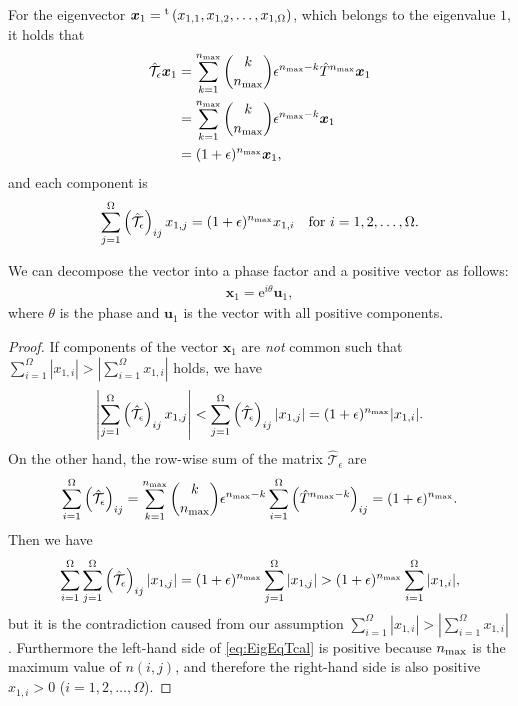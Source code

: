 For the eigenvector $\bm{x}_{1}={}^{\rm t}\left(x_{1,1},x_{1,2},\dots,x_{1,\Omega}\right)$, which belongs to the eigenvalue $1$, it holds that
\begin{align}
\hat{\mathcal{T}}_{\epsilon}\bm{x}_{1} &= \sum_{k=1}^{n_{\rm max}}\binom{k}{n_{\rm max}}\epsilon^{n_{\rm max}-k}\hat{T}^{n_{\rm max}}\bm{x}_{1}\\
&= \sum_{k=1}^{n_{\rm max}}\binom{k}{n_{\rm max}}\epsilon^{n_{\rm max}-k}\bm{x}_{1}\\
&= (1+\epsilon)^{n_{\rm max}}\bm{x}_{1},
\end{align}
and each component is
\begin{align}
\sum_{j=1}^{\Omega}\left(\hat{\mathcal{T}}_{\epsilon}\right)_{ij}x_{1,j} = (1+\epsilon)^{n_{\rm max}}x_{1,i}\quad\text{for $i=1,2,\dots,\Omega$}\label{eq:EigEqTcal}.
\end{align}

\begin{lemma}
	We can decompose the vector into a phase factor and a positive vector as follows:
	\begin{align}
	\bm{x}_{1} = \mathrm{e}^{i\theta}\bm{u}_{1},
	\end{align}
	where $\theta$ is the phase and $\bm{u}_{1}$ is the vector with all positive components.
\end{lemma}

\begin{proof}
	If components of the vector $\bm{x}_{1}$ are \textit{not} common such that $\sum_{i=1}^{\Omega}|x_{1,i}|>|\sum_{i=1}^{\Omega}x_{1,i}|$ holds, we have
	\begin{align}
	\left|\sum_{j=1}^{\Omega}\left(\hat{\mathcal{T}}_{\epsilon}\right)_{ij}x_{1,j}\right| < \sum_{j=1}^{\Omega}\left(\hat{\mathcal{T}}_{\epsilon}\right)_{ij}|x_{1,j}| = (1+\epsilon)^{n_{\rm max}}|x_{1,i}|.
	\end{align}
	On the other hand, the row-wise sum of the matrix $\hat{\mathcal{T}}_{\epsilon}$ are
	\begin{align}
	\sum_{i=1}^{\Omega}\left(\hat{\mathcal{T}}_{\epsilon}\right)_{ij} = \sum_{k=1}^{n_{\rm max}}\binom{k}{n_{\rm max}}\epsilon^{n_{\rm max}-k}\sum_{i=1}^{\Omega}\left(\hat{T}^{n_{\rm max}-k}\right)_{ij} = (1+\epsilon)^{n_{\rm max}}.
	\end{align}
	Then we have
	\begin{align}
	\sum_{i=1}^{\Omega}\sum_{j=1}^{\Omega}\left(\hat{\mathcal{T}}_{\epsilon}\right)_{ij}|x_{1,j}| = (1+\epsilon)^{n_{\rm max}}\sum_{j=1}^{\Omega}|x_{1,j}| > (1+\epsilon)^{n_{\rm max}}\sum_{i=1}^{\Omega}|x_{1,i}|,
	\end{align}
	but it is the contradiction caused from our assumption $\sum_{i=1}^{\Omega}|x_{1,i}|>|\sum_{i=1}^{\Omega}x_{1,i}|$. Furthermore the left-hand side of \eqref{eq:EigEqTcal} is positive because $n_{\rm max}$ is the maximum value of $n(i,j)$, and therefore the right-hand side is also positive $x_{1,i}>0$ ($i=1,2,\dots,\Omega$).
\end{proof}

